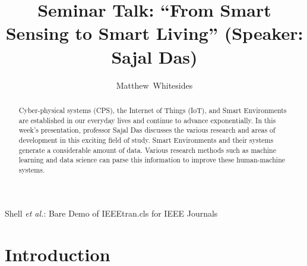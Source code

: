 \documentclass[journal,onecolumn]{IEEEtran}
\begin{document}
%
\title{Seminar Talk: ``From Smart Sensing to Smart Living'' (Speaker: Sajal Das)}

%
%
%
\author{Matthew~Whitesides}%

%
{Shell \MakeLowercase{\textit{et al.}}: Bare Demo of IEEEtran.cls for IEEE Journals}

\maketitle

\begin{abstract}
  Cyber-physical systems (CPS), the Internet of Things (IoT), and Smart Environments are established in our everyday lives and continue to advance exponentially. 
  In this week's presentation, professor Sajal Das discusses the various research and areas of development in this exciting field of study.
  Smart Environments and their systems generate a considerable amount of data. Various research methods such as machine learning and data science can parse this information to improve these human-machine systems.
\end{abstract}


\IEEEpeerreviewmaketitle

\section{Introduction}
\end{document}
